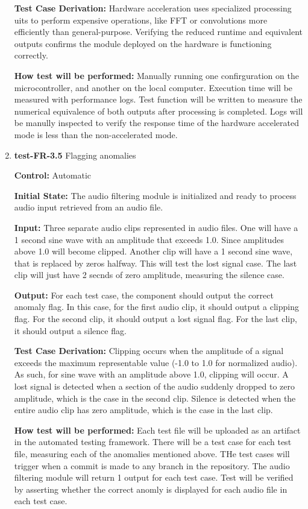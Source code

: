 \documentclass[12pt, titlepage]{article}
\begin{document}
\begin{enumerate}
\textbf{Test Case Derivation:} 
Hardware acceleration uses specialized processing uits to perform expensive 
operations, like FFT or convolutions more efficiently than general-purpose. 
Verifying the reduced runtime and equivalent outputs confirms the module 
deployed on the hardware is functioning correctly. 

\textbf{How test will be performed:}
Manually running one confirguration on the microcontroller, and another on the 
local computer. Execution time will be measured with performance logs. Test 
function will be written to measure the numerical equivalence of both outputs 
after processing is completed. Logs will be manully inspected to verify the 
response time of the hardware accelerated mode is less than the non-accelerated 
mode.

\item{\textbf{test-FR-3.5} Flagging anomalies\\}

\textbf{Control:} Automatic
					
\textbf{Initial State:} 
The audio filtering module is initialized and ready to process audio input 
retrieved from an audio file. 
					
\textbf{Input:}
Three separate audio clips represented in audio files. One will have a 1 second 
sine wave with an amplitude that exceeds 1.0. Since amplitudes above 1.0 will 
become clipped. Another clip will have a 1 second sine wave, that is replaced 
by zeros halfway. This will test the lost signal case. The last clip will just 
have 2 secnds of zero amplitude, measuring the silence case. 
					
\textbf{Output:}
For each test case, the component should output the correct anomaly flag. 
In this case, for the first audio clip, it should output a clipping flag. 
For the second clip, it should output a lost signal flag. For the last clip, 
it should output a silence flag.

\textbf{Test Case Derivation:} 
Clipping occurs when the amplitude of a signal exceeds the maximum 
representable value (-1.0 to 1.0 for normalized audio). As such, for sine wave 
with an amplitude above 1.0, clipping will occur. A lost signal is detected 
when a section of the audio suddenly dropped to zero amplitude, which is the 
case in the second clip. Silence is detected when the entire audio clip has 
zero amplitude, which is the case in the last clip.

\textbf{How test will be performed:}
Each test file will be uploaded as an artifact in the automated testing 
framework. There will be a test case for each test file, measuring each of the 
anomalies mentioned above. THe test cases will trigger when a commit is made to 
any branch in the repository. The audio filtering module will return 1 output 
for each test case. Test will be verified by asserting whether the correct 
anomly is displayed for each audio file in each test case. 

\end{enumerate}
\end{document}
